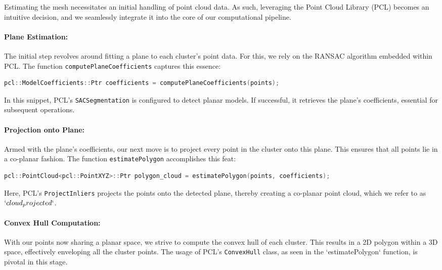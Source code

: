 \documentclass[11pt, a4paper,oneside,chapterprefix=false]{scrbook}
\begin{document}
Estimating the mesh necessitates an initial handling of point cloud data. As such, leveraging the Point Cloud Library (PCL) becomes an intuitive decision, and we seamlessly integrate it into the core of our computational pipeline.


\paragraph{Plane Estimation:} The initial step revolves around fitting a plane to each cluster's point data. For this, we rely on the RANSAC algorithm embedded within PCL. The function \texttt{computePlaneCoefficients} captures this essence:

\begin{lstlisting}[language=C++, caption=Estimating Plane Coefficients]
pcl::ModelCoefficients::Ptr coefficients = computePlaneCoefficients(points);
\end{lstlisting}

In this snippet, PCL's \texttt{SACSegmentation} is configured to detect planar models. If successful, it retrieves the plane's coefficients, essential for subsequent operations.

\paragraph{Projection onto Plane:} Armed with the plane's coefficients, our next move is to project every point in the cluster onto this plane. This ensures that all points lie in a co-planar fashion. The function \texttt{estimatePolygon} accomplishes this feat:

\begin{lstlisting}[language=C++, caption=Projecting Points onto Plane]
pcl::PointCloud<pcl::PointXYZ>::Ptr polygon_cloud = estimatePolygon(points, coefficients);
\end{lstlisting}

Here, PCL's \texttt{ProjectInliers} projects the points onto the detected plane, thereby creating a co-planar point cloud, which we refer to as $`cloud_projected`$.

\paragraph{Convex Hull Computation:} With our points now sharing a planar space, we strive to compute the convex hull of each cluster. This results in a 2D polygon within a 3D space, effectively enveloping all the cluster points. The usage of PCL's \texttt{ConvexHull} class, as seen in the `estimatePolygon` function, is pivotal in this stage.
\end{document}
